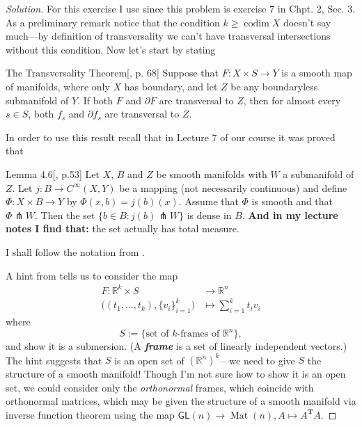 \begin{proof}[Solution]\leavevmode
For this exercise I use \cite{gui} since this problem is  exercise 7 in Chpt. 2, Sec. 3. As a preliminary remark notice that the condition \(k \geq  \operatorname{codim}X\) doesn't say much---by definition of transversality we can't have transversal intersections without this condition. Now let's start by stating
\begin{thing5}{The Transversality Theorem}[\cite{gui}, p. 68]\leavevmode
Suppose that \(F : X \times S \to Y\) is a smooth map of manifolds, where only \(X\) has boundary, and let \(Z\) be any boundaryless submanifold of \(Y\). If  both \(F\) and \(\partial  F\) are transversal to \(Z\), then for almost every \(s \in S\), both \(f_s\) and \(\partial f_s\) are transversal to \(Z\).
\end{thing5}

In order to use this result recall that in Lecture 7 of our course it was proved that

\begin{thing1}{Lemma 4.6}[\cite{gui2}, p.53]\leavevmode
Let \(X\), \(B\) and \(Z\) be smooth manifolds with \(W\) a submanifold of \(Z\). Let \(j:B \to C^\infty(X,Y)\) be a mapping (not necessarily continuous) and define \(\Phi: X \times B \to Y\) by \( \Phi(x,b)= j(b)(x)\). Assume that \(\Phi\) is smooth and that \(\Phi \pitchfork  W\). Then the set \(\{b \in B : j(b) \pitchfork  W\}\) is dense in \(B\). \textbf{And in my lecture notes I find that:} the set actually has total measure. 
\end{thing1}
I shall follow the notation from \cite{gui}.

A hint from \cite{gui} tells us to consider the map
\begin{align*}
	F: \mathbb{R}^k \times S &\longrightarrow \mathbb{R}^n \\
	\Big((t_1,\ldots,t_k), \{v_i\}_{i=1}^k \Big)&\longmapsto \sum_{i=1}^k t_iv_i
\end{align*}
where
\[S:=\{\text{set of \(k\)-frames of \(\mathbb{R}^n\)} \},\]
and show it is a submersion. (A \textit{\textbf{frame}} is a set of linearly independent vectors.) The hint suggests that \(S\) is an open set of \((\mathbb{R}^n)^k\)---we need to give \(S\) the structure of a smooth manifold! Though I'm not sure how to show it is an open set, we could consider only the \textit{orthonormal} frames, which coincide with orthonormal matrices, which may be given the structure of a smooth manifold via inverse function theorem using the map \(\mathsf{GL}(n) \to \operatorname{Mat}(n),A\mapsto A^{\mathbf{T}}A\).


\end{proof}
